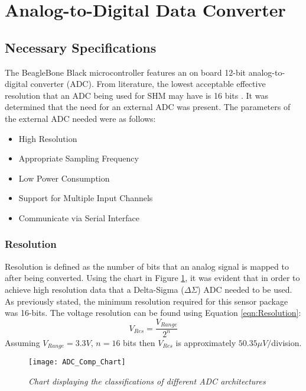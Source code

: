 \section{Analog-to-Digital Data Converter}
\subsection{Necessary Specifications}
\label{sec:ADC_Parameters}
\indent The BeagleBone Black microcontroller features an on board 12-bit analog-to-digital converter (ADC). From literature, the lowest acceptable
effective resolution that an ADC being used for SHM may have is 16 bits\cite{Cunha_Caetano} \cite{JangSWMWSS}. It was determined that the need for an
external ADC was present. The parameters of the external ADC needed were as follows:
\begin{itemize}
\item High Resolution
\item Appropriate Sampling Frequency
\item Low Power Consumption 
\item Support for Multiple Input Channels
\item Communicate via Serial Interface
\end{itemize}
\subsubsection{Resolution}
\label{sec:adc_res}
\indent Resolution is defined as the number of bits that an analog signal is mapped to after being converted\cite{MusaJouaneh:2013}. Using the chart in
Figure \ref{fig:ADC_Comp_Chart}, it was evident that in order to achieve high resolution data that a Delta-Sigma ($\Delta\Sigma$) ADC needed to be used.\\
\indent As previously stated, the minimum resolution required for this sensor package was 16-bits. The voltage resolution can be found using Equation
\ref{eqn:Resolution}:
\begin{equation}
\label{eqn:Resolution}
V_{Res} = \frac{V_{Range}}{2^{n}}
\end{equation}
Assuming $V_{Range}=3.3V$, $n=16$ bits then $V_{Res}$ is approximately $50.35\mu V/$division. 

\begin{figure}[H]
\centering
\texttt{[image: ADC\_Comp\_Chart]}
\caption{\textit{Chart displaying the classifications of different ADC architectures \cite{WaltKester:2005}}}
\label{fig:ADC_Comp_Chart}
\end{figure}
%
